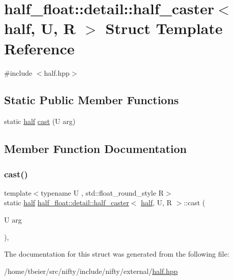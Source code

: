 \hypertarget{structhalf__float_1_1detail_1_1half__caster_3_01half_00_01U_00_01R_01_4}{}\section{half\+\_\+float\+:\+:detail\+:\+:half\+\_\+caster$<$ half, U, R $>$ Struct Template Reference}
\label{structhalf__float_1_1detail_1_1half__caster_3_01half_00_01U_00_01R_01_4}


{\ttfamily \#include $<$half.\+hpp$>$}

\subsection*{Static Public Member Functions}
\begin{DoxyCompactItemize}
\item 
static \hyperlink{classhalf__float_1_1half}{half} \hyperlink{structhalf__float_1_1detail_1_1half__caster_3_01half_00_01U_00_01R_01_4_aa32ee58e119cf3e82017c420893c3adb}{cast} (U arg)
\end{DoxyCompactItemize}


\subsection{Member Function Documentation}
\mbox{\label{structhalf__float_1_1detail_1_1half__caster_3_01half_00_01U_00_01R_01_4_aa32ee58e119cf3e82017c420893c3adb}} 
\subsubsection{\texorpdfstring{cast()}{cast()}}
{\footnotesize\ttfamily template$<$typename U , std\+::float\+\_\+round\+\_\+style R$>$ \\
static \hyperlink{classhalf__float_1_1half}{half} \hyperlink{structhalf__float_1_1detail_1_1half__caster}{half\+\_\+float\+::detail\+::half\+\_\+caster}$<$ \hyperlink{classhalf__float_1_1half}{half}, U, R $>$\+::cast (\begin{DoxyParamCaption}\item[{U}]{arg }\end{DoxyParamCaption})\hspace{0.3cm}{\ttfamily [inline]}, {\ttfamily [static]}}



The documentation for this struct was generated from the following file\+:\begin{DoxyCompactItemize}
\item 
/home/tbeier/src/nifty/include/nifty/external/\hyperlink{half_8hpp}{half.\+hpp}\end{DoxyCompactItemize}
